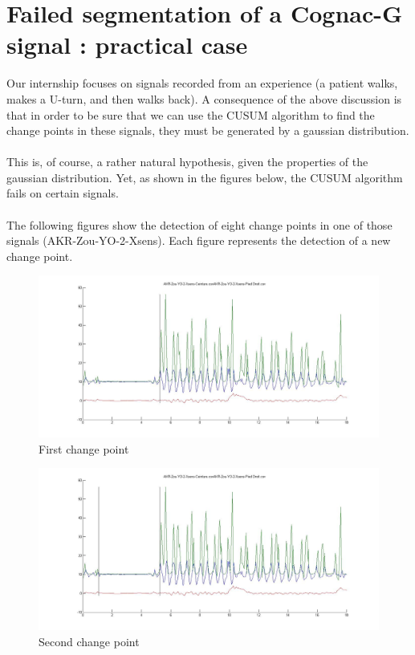 \documentclass[french]{article}
\begin{document}
\section{Failed segmentation of a Cognac-G signal : practical case}
Our internship focuses on signals recorded from an experience (a patient walks, makes a U-turn, and then walks back). A consequence of the above discussion is that in order to be sure that we can use the CUSUM algorithm to find the change points in these signals, they must be generated by a gaussian distribution.
\\ \\
This is, of course, a rather natural hypothesis, given the properties of the gaussian distribution. Yet, as shown in the figures below, the CUSUM algorithm fails on certain signals.
\\ \\
The following figures show the detection of eight change points in one of those signals (AKR-Zou-YO-2-Xsens). Each figure represents the detection of a new change point.

\begin{figure}[h]
	\includegraphics[scale=0.3]{seg1.jpg}
	\caption{First change point}
	\label{1ststep}
\end{figure}

\begin{figure}[h]
	\includegraphics[scale=0.3]{seg2.jpg}
	\caption{Second change point}
\end{figure}
\end{document}
